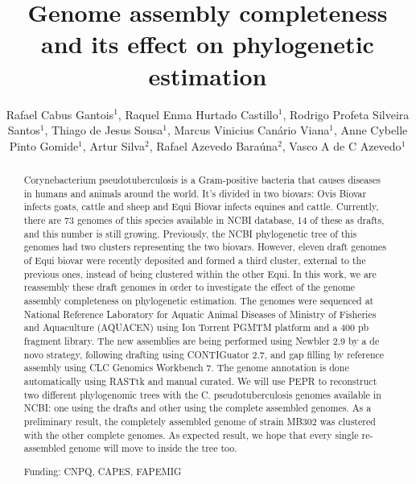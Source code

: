 \documentclass[twoside]{article}
\title{\vspace{-15mm}\fontsize{24pt}{10pt}\selectfont\textbf{Genome assembly completeness and its effect on phylogenetic estimation}} %
\author{Rafael Cabus Gantois$^1$, Raquel Enma Hurtado Castillo$^1$, Rodrigo Profeta Silveira Santos$^1$, Thiago de Jesus Sousa$^1$, Marcus Vinicius Can\'ario Viana$^1$, Anne Cybelle Pinto Gomide$^1$, Artur Silva$^2$, Rafael Azevedo Bara\'una$^2$, Vasco A de C Azevedo$^1$}
\affil{1 UFMG\\ 2 UFPA\\ }
\date{}
\begin{document}
\maketitle %

\thispagestyle{fancy} %


\begin{abstract}
Corynebacterium pseudotuberculosis is a Gram-positive bacteria that causes diseases in humans and animals around the world. It's divided in two biovars: Ovis Biovar infects goats, cattle and sheep and Equi Biovar infects equines and cattle. Currently, there are 73 genomes of this species available in NCBI database, 14 of these as drafts, and this number is still growing. Previously, the NCBI phylogenetic tree of this genomes had two clusters representing the two biovars. However, eleven draft genomes of Equi biovar were recently deposited and formed a third cluster, external to the previous ones, instead of being clustered within the other Equi. In this work, we are reassembly these draft genomes in order to investigate the effect of the genome assembly completeness on phylogenetic estimation. The genomes were sequenced at National Reference Laboratory for Aquatic Animal Diseases of Ministry of Fisheries and Aquaculture (AQUACEN) using Ion Torrent PGMTM platform and a 400 pb fragment library. The new assemblies are being performed using Newbler 2.9 by a de novo strategy, following drafting using CONTIGuator 2.7, and gap filling by reference assembly using CLC Genomics Workbench 7. The genome annotation is done automatically using RASTtk and manual curated. We will use PEPR to reconstruct two different phylogenomic trees with the C. pseudotuberculosis genomes available in NCBI: one using the drafts and other using the complete assembled genomes. As a preliminary result, the completely assembled genome of strain MB302 was clustered with the other complete genomes. As expected result, we hope that every single re-assembled genome will move to inside the tree too.

Funding: CNPQ, CAPES, FAPEMIG
\end{abstract}
\end{document}

